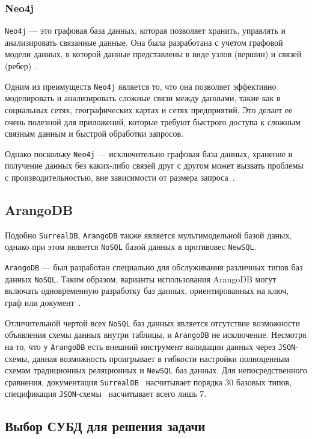 \subsubsection{Neo4j}

\texttt{Neo4j} --- это графовая база данных, которая позволяет хранить, управлять и анализировать связанные данные. 
Она была разработана с учетом графовой модели данных, в которой данные представлены в виде узлов (вершин) и связей (ребер)~\cite{neo4j}. 

Одним из преимуществ \texttt{Neo4j} является то, что она позволяет эффективно моделировать и анализировать сложные связи между данными, такие как в социальных сетях, географических картах и сетях предприятий.
Это делает ее очень полезной для приложений, которые требуют быстрого доступа к сложным связным данным и быстрой обработки запросов.

Однако поскольку \texttt{Neo4j} --- исключительно графовая база данных, хранение и получение данных без каких-либо связей друг с другом может вызвать проблемы с производительностью, вне зависимости от размера запроса~\cite{neocons}.

\subsection{ArangoDB}

Подобно \texttt{SurrealDB}, \texttt{ArangoDB} также является мультимодельной базой даных, однако при этом является \texttt{NoSQL} базой данных в противовес \texttt{NewSQL}.

\texttt{ArangoDB} ---  был разработан специально для обслуживания различных типов баз данных \texttt{NoSQL}. 
Таким образом, варианты использования ArangoDB могут включать одновременную разработку баз данных, ориентированных на ключ, граф или документ~\cite{arangodb}.

Отличительной чертой всех \texttt{NoSQL} баз данных является отсутствие возможности объявления схемы данных внутри таблицы, и \texttt{ArangoDB} не исключение. 
Несмотря на то, что у \texttt{ArangoDB} есть внешний инструмент валидации данных через \texttt{JSON}-схемы, данная возможность проигрывает в гибкости настройки полноценным схемам традиционных реляционных и \texttt{NewSQL} баз данных.
Для непосредственного сравнения, документация \texttt{SurrealDB}~\cite{surrealdb-doc} насчитывает порядка 30 базовых типов, спецификация \texttt{JSON}-схемы~\cite{json-type} насчитывает всего лишь 7.
\subsection{Выбор СУБД для решения задачи}

